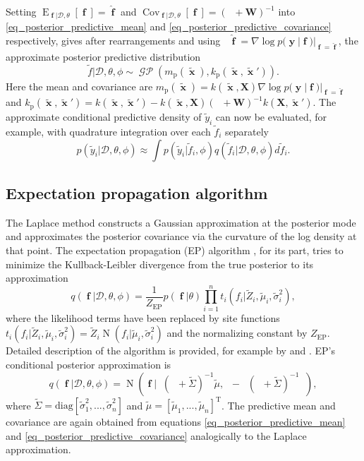 \documentclass[twoside,11pt]{article}
\DeclareMathOperator{\Kff}{\mathbf{K}_{f,f}}
\DeclareMathOperator{\iKff}{\mathbf{K}_{f,f}^{-1}}
\DeclareMathOperator{\x}{\mathbf{x}}
\DeclareMathOperator{\f}{\mathbf{f}}
\DeclareMathOperator{\y}{\mathbf{y}}
\DeclareMathOperator{\GP}{\mathcal{GP}}
\DeclareMathOperator{\N}{N}
\newcommand{\mb}{\mathbf}
\DeclareMathOperator{\E}{E}
\DeclareMathOperator{\COV}{Cov}
\begin{document}
Setting $\E_{\f|\mathcal{D},\theta}[\f] = \hat{\f}$ and
$\COV_{\f|\mathcal{D},\theta}[\f] = (\iKff + \mb{W})^{-1}$ into
\eqref{eq_posterior_predictive_mean} and
\eqref{eq_posterior_predictive_covariance} respectively, gives after
rearrangements and using $\iKff\hat{\f} = \nabla\log
p(\y|\f)|_{\f=\hat{\f}}$, the approximate posterior predictive
distribution
%
\begin{equation}\label{eq_posterior_in_Laplace_case}
\tilde{f}|\mathcal{D},\theta, \phi \sim \GP\left(m_{\text{p}}(\tilde{\x}), k_{\text{p}}(\tilde{\x},\tilde{\x}')\right).
\end{equation}
%
Here the mean and covariance are $m_{\text{p}}(\tilde{\x}) = k(\tilde{\x},\mb{X})\nabla\log
p(\y|\f)|_{\f=\hat{\f}}$ and 
$k_{\text{p}}(\tilde{\x},\tilde{\x}')=k(\tilde{\x},\tilde{\x}') - k(\tilde{\x},\mb{X})(\Kff +
\mb{W})^{-1}k(\mb{X},\tilde{\x}')$.
%
The approximate conditional predictive density of $\tilde{y}_i$ can
now be evaluated, for example, with quadrature integration over each
$\tilde{f}_i$ separately
%
\begin{equation}
p(\tilde{y}_i|\mathcal{D}, \theta, \phi) \approx \int
p(\tilde{y}_i|\tilde{f}_i,\phi)q(\tilde{f}_i|\mathcal{D}, \theta,
\phi) d \tilde{f}_i. 
\end{equation}
%    
\subsection{Expectation propagation algorithm}

The Laplace method constructs a Gaussian approximation at the
posterior mode and approximates the posterior covariance via the
curvature of the log density at that point. The expectation
propagation (EP) algorithm \citep{Minka:2001}, for its part, tries to
minimize the Kullback-Leibler divergence from the true posterior to
its approximation
%
\begin{equation}\label{eq_EP_post}
 q(\f|\mathcal{D},
\theta,\phi) = \frac{1}{Z_{\text{EP}}}p(\f|\theta)\prod_{i=1}^n
t_i(f_i|\tilde{Z}_i, \tilde{\mu}_i,\tilde{\sigma}_i^2),
\end{equation}
%
where the likelihood terms have been replaced by site functions
$t_i(f_i|\tilde{Z}_i, \tilde{\mu}_i,\tilde{\sigma}_i^2) = \tilde{Z}_i
\N(f_i|\tilde{\mu}_i,\tilde{\sigma}_i^2)$ and the normalizing constant
by $Z_{\text{EP}}$. Detailed description of the algorithm is
provided, for example by \citet{Rasmussen+Williams:2006} and
\citet{Jylanki+Vanhatalo+Vehtari:2011}. EP's conditional posterior
approximation is
%
\begin{equation}\label{eq_posterior_in_EP_case}
q(\f|\mathcal{D},\theta,\phi) = \N(\f|\Kff(\Kff +
  \tilde{\Sigma})^{-1} \tilde{\mu}, \Kff -  \Kff(\Kff +
  \tilde{\Sigma})^{-1}\Kff),
\end{equation}
%
where $\tilde{\Sigma} =
\text{diag}[\tilde{\sigma}_1^{2},...,\tilde{\sigma}_n^{2}]$ and
$\tilde{\mu} = [\tilde{\mu}_1,...,\tilde{\mu}_n]^{\text{T}}$. The
predictive mean and covariance are again obtained from equations
\eqref{eq_posterior_predictive_mean} and
\eqref{eq_posterior_predictive_covariance} analogically to the Laplace
approximation.
\end{document}
